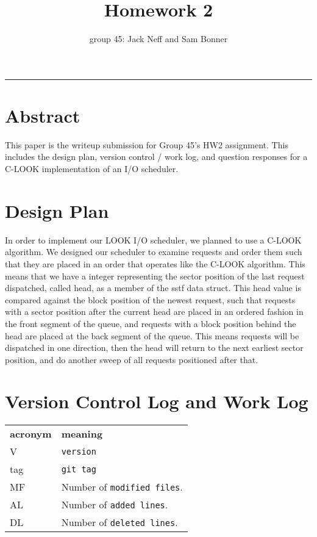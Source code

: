 \documentclass[letterpaper,10pt,fleqn]{article}
\title{Homework 2}
\author{group 45: Jack Neff and Sam Bonner}
\begin{document}
\maketitle
\hrule

\section*{Abstract}

This paper is the writeup submission for Group 45's HW2 assignment. This includes the design plan, version control / work log, and question responses for a C-LOOK implementation of an I/O scheduler.

\pagebreak
\section*{Design Plan}

In order to implement our LOOK I/O scheduler, we planned to use a C-LOOK algorithm. We designed our scheduler to examine requests and order them such that they are placed in an order that operates like the C-LOOK algorithm. This means that we have a integer representing the sector position of the last request dispatched, called head, as a member of the sstf data struct. This head value is compared against the block position of the newest request, such that requests with a sector position after the current head are placed in an ordered fashion in the front segment of the queue, and requests with a block position behind the head are placed at the back segment of the queue. This means requests will be dispatched in one direction, then the head will return to the next earliest sector position, and do another sweep of all requests positioned after that.

\section{Version Control Log and Work Log}
 
 \begin{tabular}{lp{8cm}}
  \label{tabular:legend:git-log}
  \textbf{acronym} & \textbf{meaning} \\
  V & \texttt{version} \\
  tag & \texttt{git tag} \\
  MF & Number of \texttt{modified files}. \\
  AL & Number of \texttt{added lines}. \\
  DL & Number of \texttt{deleted lines}. \\
\end{tabular}
\end{document}

